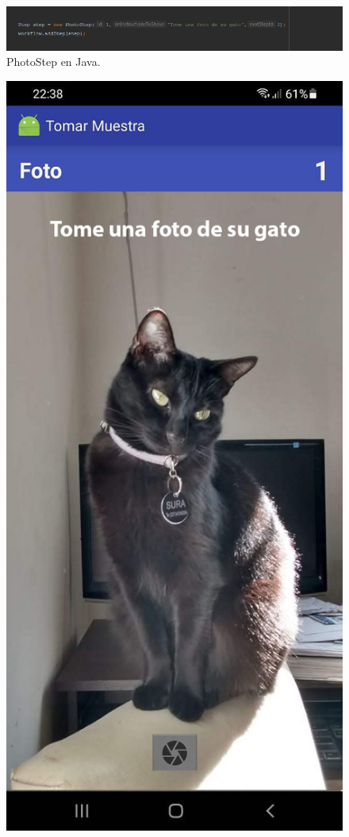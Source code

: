 \begin{figure}[H]
  \centering
    \includegraphics[scale=0.6]{50-anexos/C-steps/photo_java.png} 
    \caption{PhotoStep en Java.}
\end{figure}


\begin{figure}[H]
  \centering
   \includegraphics[scale=0.23]{50-anexos/C-steps/photo_screen1.jpg} 

\end{figure}
